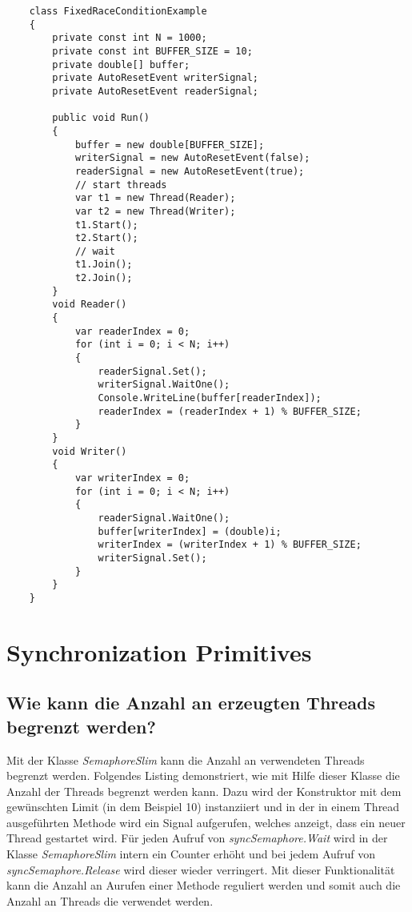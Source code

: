\documentclass[a4paper,ngerman]{scrartcl}
\begin{document}
\begin{lstlisting}
    class FixedRaceConditionExample
    {
        private const int N = 1000;
        private const int BUFFER_SIZE = 10;
        private double[] buffer;
        private AutoResetEvent writerSignal;
        private AutoResetEvent readerSignal;

        public void Run()
        {
            buffer = new double[BUFFER_SIZE];
            writerSignal = new AutoResetEvent(false);
            readerSignal = new AutoResetEvent(true);
            // start threads
            var t1 = new Thread(Reader);
            var t2 = new Thread(Writer);
            t1.Start();
            t2.Start();
            // wait
            t1.Join();
            t2.Join();
        }
        void Reader()
        {
            var readerIndex = 0;
            for (int i = 0; i < N; i++)
            {
                readerSignal.Set();
                writerSignal.WaitOne();
                Console.WriteLine(buffer[readerIndex]);
                readerIndex = (readerIndex + 1) % BUFFER_SIZE;
            }
        }
        void Writer()
        {
            var writerIndex = 0;
            for (int i = 0; i < N; i++)
            {
                readerSignal.WaitOne();
                buffer[writerIndex] = (double)i;
                writerIndex = (writerIndex + 1) % BUFFER_SIZE;
                writerSignal.Set();
            }
        }
    }
\end{lstlisting}


\section{Synchronization Primitives}
\subsection{Wie kann die Anzahl an erzeugten Threads begrenzt werden?}
Mit der Klasse \textit{SemaphoreSlim} kann die Anzahl an verwendeten Threads begrenzt werden. Folgendes Listing
demonstriert, wie mit Hilfe dieser Klasse die Anzahl der Threads begrenzt werden kann. Dazu wird der Konstruktor
mit dem gewünschten Limit (in dem Beispiel 10) instanziiert und in der in einem Thread ausgeführten Methode wird 
ein Signal aufgerufen, welches anzeigt, dass ein neuer Thread gestartet wird. Für jeden Aufruf von \textit{syncSemaphore.Wait}
wird in der Klasse \textit{SemaphoreSlim} intern ein Counter erhöht und bei jedem Aufruf von \textit{syncSemaphore.Release}
wird dieser wieder verringert. Mit dieser Funktionalität kann die Anzahl an Aurufen einer Methode reguliert werden und somit
auch die Anzahl an Threads die verwendet werden.
\end{document}
